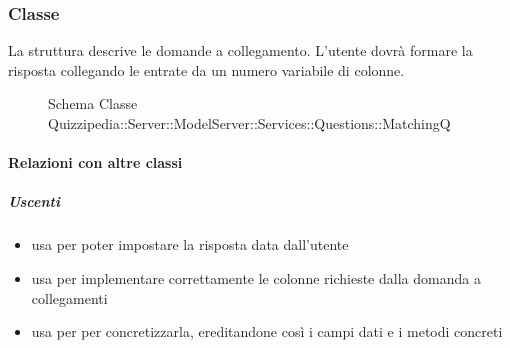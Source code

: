 \subsubsection{Classe }
La struttura descrive le domande a collegamento. L'utente dovrà formare la risposta collegando le entrate da un numero variabile di colonne.
\begin{figure}[H]
\centering
\noindent{}
\caption[Schema Classe MatchingQ]{Schema Classe Quizzipedia::Server::ModelServer::Services::Questions::MatchingQ}
\end{figure}
\paragraph{Relazioni con altre classi}
\subparagraph{Uscenti}
\begin{itemize}
\item usa  per poter impostare la risposta data dall'utente
\item usa  per implementare correttamente le colonne richieste dalla domanda a collegamenti
\item usa  per per concretizzarla, ereditandone così i campi dati e i metodi concreti
\end{itemize}
